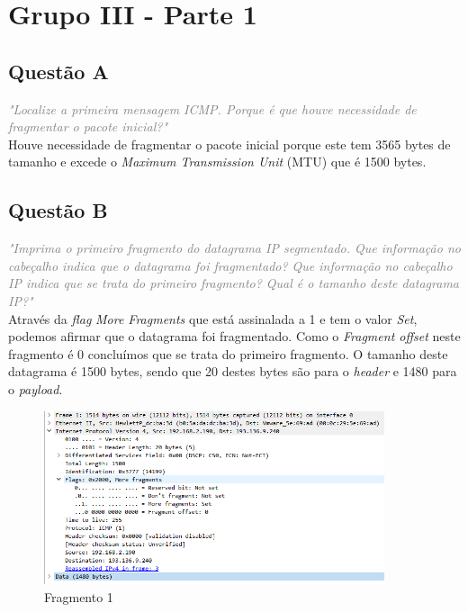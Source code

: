 \documentclass{llncs}
\newcommand{\questionE}[1]{\textcolor{gray}{\textit{"#1"}}}
\begin{document}
\clearpage

\section{Grupo III - Parte 1}

\subsection{Questão A}
\hspace{3mm} 
\questionE{Localize a primeira mensagem ICMP. Porque é que houve necessidade de fragmentar o pacote inicial?}\\ 

Houve necessidade de fragmentar o pacote inicial porque este tem 3565 bytes de tamanho e excede o \textit{Maximum Transmission Unit} (MTU) que é 1500 bytes.

\subsection{Questão B}
\hspace{3mm}
\questionE{Imprima o primeiro fragmento do datagrama IP segmentado. Que informação no cabeçalho indica que o datagrama foi fragmentado? Que informação no cabeçalho IP indica que se trata do primeiro fragmento? Qual é o tamanho deste datagrama IP?}\\

Através da \textit{flag} \textit{More Fragments} que está assinalada a 1 e tem o valor \textit{Set}, podemos afirmar que o datagrama foi fragmentado. Como o \textit{Fragment offset} neste fragmento é 0 concluímos que se trata do primeiro fragmento. O tamanho deste datagrama é 1500 bytes, sendo que 20 destes bytes são para o \textit{header} e 1480 para o \textit{payload}.

\begin{figure}[H]
\begin{center}
\includegraphics[width=10cm]{3bfragmento1.PNG}
\end{center}
\caption{Fragmento 1}
\end{figure}
\end{document}
